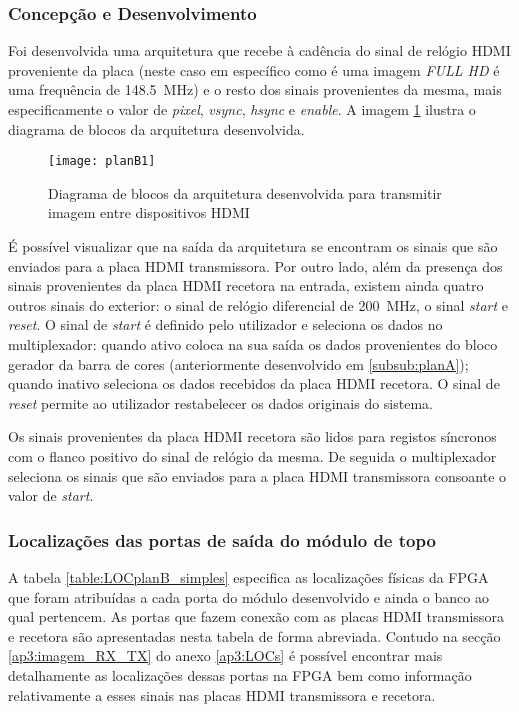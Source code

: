 \subsubsection*{Concepção e Desenvolvimento}

Foi desenvolvida uma arquitetura que recebe à cadência do sinal de relógio HDMI proveniente da placa (neste caso em específico como é uma imagem \textit{FULL HD} é uma frequência de \SI{148.5}{\mega\hertz}) e o resto dos sinais provenientes da mesma, mais especificamente o valor de \textit{pixel}, \textit{vsync}, \textit{hsync} e \textit{enable}. A imagem \ref{fig:planb1} ilustra o diagrama de blocos da arquitetura desenvolvida.

\begin{figure}[h!]
	\begin{center}
		\leavevmode
		\texttt{[image: planB1]}
		\caption{Diagrama de blocos da arquitetura desenvolvida para transmitir imagem entre dispositivos HDMI}
		\label{fig:planb1}
	\end{center}
\end{figure}

É possível visualizar que na saída da arquitetura se encontram os sinais que são enviados para a placa HDMI transmissora. Por outro lado, além da presença dos sinais provenientes da placa HDMI recetora na entrada, existem ainda quatro outros sinais do exterior: o sinal de relógio diferencial de \SI{200}{\mega\hertz}, o sinal \textit{start} e \textit{reset}. O sinal de \textit{start} é definido pelo utilizador e seleciona os dados no multiplexador: quando ativo coloca na sua saída os dados provenientes do bloco gerador da barra de cores (anteriormente desenvolvido em \ref{subsub:planA}); quando inativo seleciona os dados recebidos da placa HDMI recetora. O sinal de \textit{reset} permite ao utilizador restabelecer os dados originais do sistema.

Os sinais provenientes da placa HDMI recetora são lidos para registos síncronos com o flanco positivo do sinal de relógio da mesma. De seguida o multiplexador seleciona os sinais que são enviados para a placa HDMI transmissora consoante o valor de \textit{start}.

\subsubsection*{Localizações das portas de saída do módulo de topo} 

A tabela \ref{table:LOCplanB_simples} especifica as localizações físicas da FPGA que foram atribuídas a cada porta do módulo desenvolvido e ainda o banco ao qual pertencem. As portas que fazem conexão com as placas HDMI transmissora e recetora são apresentadas nesta tabela de forma abreviada. Contudo na secção \ref{ap3:imagem_RX_TX} do anexo \ref{ap3:LOCs} é possível encontrar mais detalhamente as localizações dessas portas na FPGA bem como informação relativamente a esses sinais nas placas HDMI transmissora e recetora.


